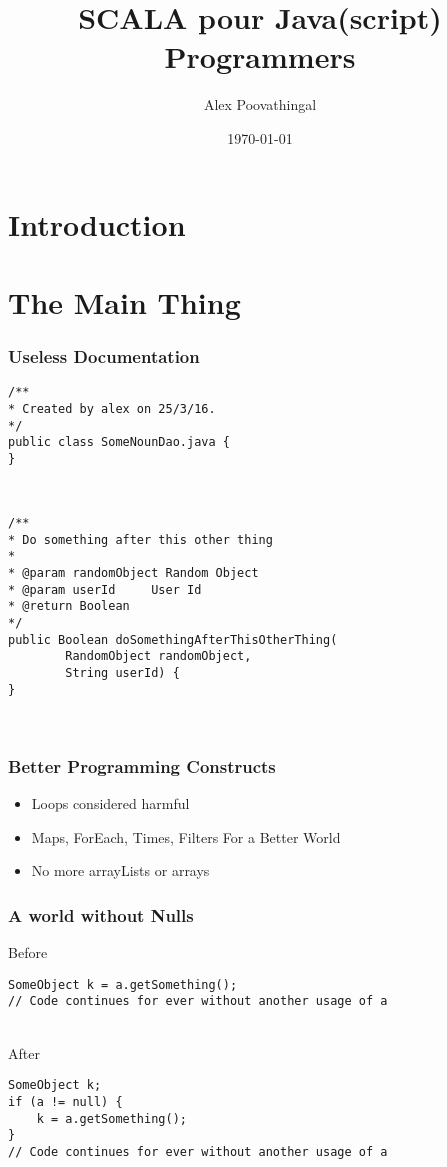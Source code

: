 \documentclass{beamer}
\title{SCALA pour Java(script) Programmers}
\subtitle{}
\author{Alex Poovathingal}
\institute{Gozefo.com}
\date{\today}
\begin{document}
\frame{
	\titlepage
}

\section{Introduction}

\section{The Main Thing}
\begin{frame}[fragile]
\frametitle{Useless Documentation}
\footnotesize
\begin{verbatim}
/**
* Created by alex on 25/3/16.
*/
public class SomeNounDao.java {
}
\end{verbatim}\\
\begin{verbatim}
/**
* Do something after this other thing
*
* @param randomObject Random Object
* @param userId     User Id
* @return Boolean
*/
public Boolean doSomethingAfterThisOtherThing(
        RandomObject randomObject,
        String userId) {
}
\end{verbatim}\\
\normalsize
\end{frame}

\begin{frame}[fragile]
\frametitle{Better Programming Constructs}
\begin{itemize}
	\item Loops considered harmful
	\item Maps, ForEach, Times, Filters For a Better World
	\item No more arrayLists or arrays
\end{itemize}
\end{frame}

\begin{frame}[fragile]
\frametitle{A world without Nulls}
\footnotesize
Before
\begin{verbatim}
SomeObject k = a.getSomething();
// Code continues for ever without another usage of a
\end{verbatim}\\
After
\begin{verbatim}
SomeObject k;
if (a != null) {
    k = a.getSomething();
}
// Code continues for ever without another usage of a
\end{verbatim}\\
\normalsize
\end{frame}
\end{document}
